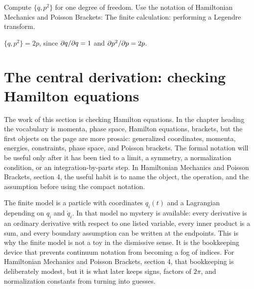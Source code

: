 \begin{exercise}
Compute \(\{q,p^2\}\) for one degree of freedom.  Use the notation of Hamiltonian Mechanics and Poisson Brackets: The finite calculation: performing a Legendre transform.
\begin{answer}
\(\{q,p^2\}=2p\), since \(\partial q/\partial q=1\) and \(\partial p^2/\partial p=2p\).
\end{answer}
\end{exercise}



\section{The central derivation: checking Hamilton equations}













The work of this section is checking Hamilton equations.  In the chapter heading the vocabulary is momenta, phase space, Hamilton equations, brackets, but the first objects on the page are more prosaic: generalized coordinates, momenta, energies, constraints, phase space, and Poisson brackets.  The formal notation will be useful only after it has been tied to a limit, a symmetry, a normalization condition, or an integration-by-parts step.  In Hamiltonian Mechanics and Poisson Brackets, section 4, the useful habit is to name the object, the operation, and the assumption before using the compact notation.

The finite model is a particle with coordinates \(q_i(t)\) and a Lagrangian depending on \(q_i\) and \(\dot q_i\).  In that model no mystery is available: every derivative is an ordinary derivative with respect to one listed variable, every inner product is a sum, and every boundary assumption can be written at the endpoints.  This is why the finite model is not a toy in the dismissive sense.  It is the bookkeeping device that prevents continuum notation from becoming a fog of indices.  For Hamiltonian Mechanics and Poisson Brackets, section 4, that bookkeeping is deliberately modest, but it is what later keeps signs, factors of \(2\pi\), and normalization constants from turning into guesses.

